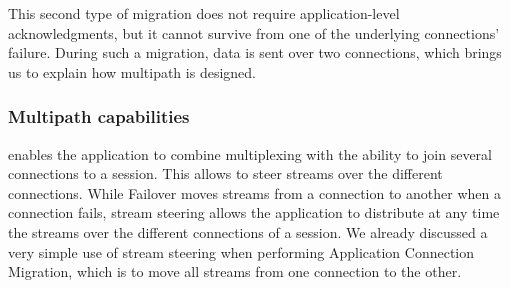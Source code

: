 
This second type of migration does not require application-level
acknowledgments, but it cannot survive from one of the
underlying connections' failure. During such a migration, data is sent over two
connections, which brings us to explain how multipath is designed.

\subsubsection{Multipath capabilities}

\tcpls enables the application to combine multiplexing with the ability to join
several \tcp connections to a \tcpls session. This allows to steer \tcpls
streams over the different \tcp connections. While Failover moves
\tcpls streams from a connection to another when a \tcp connection fails, stream
steering allows the application to distribute at any time the streams over the 
different
\tcp connections of a \tcpls session. We already discussed a very simple use of
stream steering when performing Application Connection Migration, which is to 
move all streams from one connection to the other.


